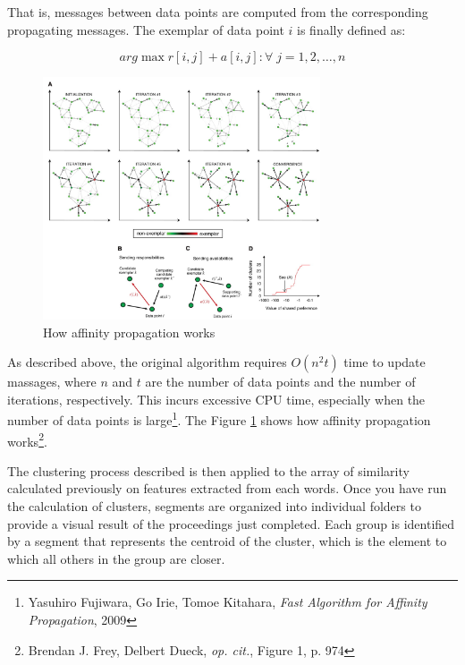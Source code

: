That is, messages between data points are computed from the corresponding propagating messages. The exemplar of data point $i$ is finally defined as:

$$arg \max {r[i, j] + a[i, j] : \forall \; j = 1, 2, \ldots,n}$$

\begin{figure}[H]
\centering
\includegraphics[width=0.73\textwidth]{images/ap.jpg}
\caption{How affinity propagation works}
\label{fig:ap}
\end{figure}

As described above, the original algorithm requires $O(n^2 t)$ time to update massages, where $n$ and $t$ are the number of data points and the number of iterations, respectively.
This incurs excessive CPU time, especially when the number of data points is large\footnote{Yasuhiro Fujiwara, Go Irie, Tomoe Kitahara, \emph{Fast Algorithm for Affinity Propagation}, 2009}. The Figure \ref{fig:ap} shows how affinity propagation works\footnote{Brendan J. Frey, Delbert Dueck, \emph{op. cit.}, Figure 1, p. 974}.

The clustering process described is then applied to the array of similarity calculated previously on features extracted from each words. Once you have run the calculation of clusters, segments are organized into individual folders to provide a visual result of the proceedings just completed. Each group is identified by a segment that represents the centroid of the cluster, which is the element to which all others in the group are closer.